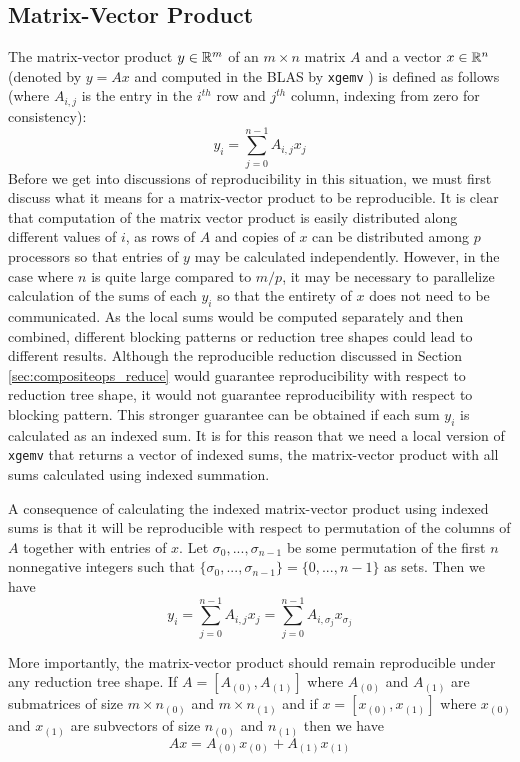 \subsection{Matrix-Vector Product}
  \label{sec:compositeops_gemv}
  The matrix-vector product $y \in \mathbb{R}^m$ of an $m \times n$ matrix $A$ and a vector $x \in \mathbb{R}^n$ (denoted by $y = Ax$ and computed in the BLAS by \texttt{xgemv} \cite{BLAS}) is defined as follows (where $A_{i, j}$ is the entry in the $i^{th}$ row and $j^{th}$ column, indexing from zero for consistency):
  \[
    y_i = \sum\limits_{j = 0}^{n - 1} A_{i, j}x_j
  \]
  Before we get into discussions of reproducibility in this situation, we must first discuss what it means for a matrix-vector product to be reproducible.
  It is clear that computation of the matrix vector product is easily distributed along different values of $i$, as rows of $A$ and copies of $x$ can be distributed among $p$ processors so that entries of $y$ may be calculated independently.
  However, in the case where $n$ is quite large compared to $m/p$, it may be necessary to parallelize calculation of the sums of each $y_i$ so that the entirety of $x$ does not need to be communicated.
  As the local sums would be computed separately and then combined, different blocking patterns or reduction tree shapes could lead to different results.
  Although the reproducible reduction discussed in Section \ref{sec:compositeops_reduce} would guarantee reproducibility with respect to reduction tree shape, it would not guarantee reproducibility with respect to blocking pattern. This stronger guarantee can be obtained if each sum $y_i$ is calculated as an indexed sum.
  It is for this reason that we need a local version of \texttt{xgemv} that returns a vector of indexed sums, the matrix-vector product with all sums calculated using indexed summation.

  A consequence of calculating the indexed matrix-vector product using indexed sums is that it will be reproducible with respect to permutation of the columns of $A$ together with entries of $x$.
  Let $\sigma_0, ..., \sigma_{n - 1}$ be some permutation of the first $n$ nonnegative integers such that $\{\sigma_0, ..., \sigma_{n - 1}\} = \{0, ..., n - 1\}$ as sets. Then we have
  \[
    y_i = \sum\limits_{j = 0}^{n - 1} A_{i, j}x_j = \sum\limits_{j = 0}^{n - 1} A_{i, \sigma_j}x_{\sigma_j}
  \]

  More importantly, the matrix-vector product should remain reproducible under any reduction tree shape.
  If $A = [A_{(0)}, A_{(1)}]$ where $A_{(0)}$ and $A_{(1)}$ are submatrices of size $m \times n_{(0)}$ and $m \times n_{(1)}$ and if $x = [x_{(0)}, x_{(1)}]$ where $x_{(0)}$ and $x_{(1)}$ are subvectors of size $n_{(0)}$ and $n_{(1)}$ then we have 
  \[
    Ax = A_{(0)}x_{(0)} + A_{(1)}x_{(1)}
  \]

